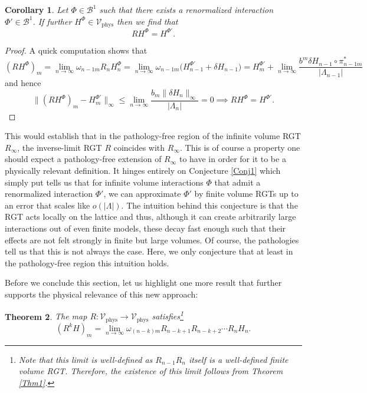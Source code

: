 \documentclass{article}
\newtheorem{theorem}{Theorem}[section]
\newtheorem{corollary}[theorem]{Corollary}
\newcommand{\phys}{\mathrm{phys}}
\begin{document}
\begin{corollary}
    Let $\Phi\in\mathcal{B}^1$ such that there exists a renormalized interaction $\Phi'\in\mathcal{B}^1$. If further $H^\Phi\in \mathcal{V}_\phys$ then we find that
    \begin{equation}
        RH^\Phi=H^{\Phi'}.
    \end{equation}
\end{corollary}

\begin{proof}
    A quick computation shows that
    \begin{equation}
        (RH^\Phi)_m=\lim_{n\to\infty}\omega_{n-1m}R_nH_n^\Phi=\lim_{n\to\infty}\omega_{n-1m}\big(H_{n-1}^{\Phi'}+\delta H_{n-1}\big)=H_m^{\Phi'}+\lim_{n\to\infty}\frac{b^m\delta H_{n-1}\circ\pi_{n-1m}^*}{|\Lambda_{n-1}|}
    \end{equation}
    and hence
    \begin{equation}
        \|(RH^\Phi)_m-H_m^{\Phi'}\|_\infty\leq\lim_{n\to\infty}\frac{b_m\|\delta H_n\|_\infty}{|\Lambda_n|}=0\implies RH^\Phi=H^{\Phi'}.
    \end{equation}
\end{proof}

This would establish that in the pathology-free region of the infinite volume RGT $R_\infty$, the inverse-limit RGT $R$ coincides with $R_\infty$. This is of course a property one should expect a pathology-free extension of $R_\infty$ to have in order for it to be a physically relevant definition. It hinges entirely on Conjecture \ref{Conj1} which simply put tells us that for infinite volume interactions $\Phi$ that admit a renormalized interaction $\Phi'$, we can approximate $\Phi'$ by finite volume RGTs up to an error that scales like $o(|\Lambda|)$. The intuition behind this conjecture is that the RGT acts locally on the lattice and thus, although it can create arbitrarily large interactions out of even finite models, these decay fast enough such that their effects are not felt strongly in finite but large volumes. Of course, the pathologies tell us that this is not always the case. Here, we only conjecture that at least in the pathology-free region this intuition holds.\bigskip

Before we conclude this section, let us highlight one more result that further supports the physical relevance of this new approach:

\begin{theorem}
    The map $R:\mathcal{V}_\phys\to\mathcal{V}_\phys$ satisfies\footnote{Note that this limit is well-defined as $R_{n-1}R_n$ itself is a well-defined finite volume RGT. Therefore, the existence of this limit follows from Theorem \ref{Thm1}.}
    \begin{equation}\label{Eq4}
        (R^kH)_m=\lim_{n\to\infty}\omega_{(n-k)m}R_{n-k+1}R_{n-k+2}\cdots R_nH_n.
    \end{equation}
\end{theorem}
\end{document}
